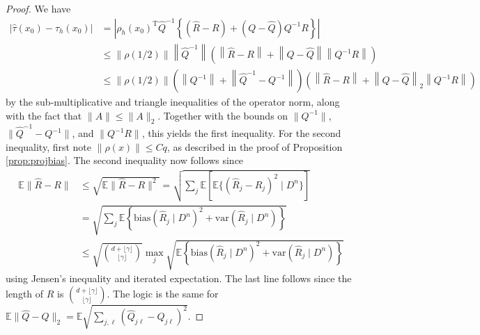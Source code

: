 \documentclass[11pt,twoside]{article}
\def\T{{ \mathrm{\scriptscriptstyle T} }}
\newcommand{\var}{\text{var}}
\newcommand{\E}{\mathbb{E}}
\newcommand{\bias}{\text{bias}}
\theoremstyle{definition}
\theoremstyle{remark}
\begin{document}
\begin{proof}
We have
\begin{align*}
| \widehat\tau(x_0) - \tau_h(x_0) | %
&= \left| \rho_h(x_0)^\T \widehat{Q}^{-1} \left\{  \left( \widehat{R} - R \right) +    \left( Q - \widehat{Q} \right) Q^{-1} R \right\} \right| \\
&\leq \|\rho(1/2) \| \left\| \widehat{Q}^{-1}  \right\| \left( \left\| \widehat{R} - R \right\|  + \left\|  Q - \widehat{Q} \right\| \left\| Q^{-1} R \right\| \right) \\
& \leq \|\rho(1/2) \| \left( \left\| Q^{-1} \right\|+ \left\| \widehat{Q}^{-1} - Q^{-1} \right\| \right) \left( \left\| \widehat{R} - R \right\|  + \left\|  Q - \widehat{Q} \right\|_2 \left\| Q^{-1} R \right\| \right)
\end{align*}
by the sub-multiplicative and triangle inequalities of the operator norm, along with the fact that $\| A \| \leq \| A \|_2$. Together with the bounds on $\|Q^{-1} \|$, $\| \widehat{Q}^{-1} - Q^{-1} \|$, and $\| Q^{-1} R \|$, this yields the first inequality. For the second inequality, first note $\| \rho(x)\| \leq Cq$, as described in the proof of Proposition \ref{prop:projbias}.  The second inequality now  follows since
\begin{align*}
\E\| \widehat{R} - R  \|  &\leq \sqrt{ \E\| \widehat{R} - R  \|^2 } %
= \sqrt{ \sum_j \E\left[ \E\Big\{ (\widehat{R}_j - R_j)^2 \mid D^n \Big\} \right] } \\
&= \sqrt{ \sum_j \E\left\{ \bias(\widehat{R}_j \mid D^n)^2 + \var(\widehat{R}_j \mid D^n) \right\} } \\
&\leq \sqrt{ {{ d + \lfloor \gamma \rfloor } \choose { \lfloor\gamma \rfloor }} } \max_j \sqrt{ \E\left\{ \bias(\widehat{R}_j \mid D^n)^2 + \var(\widehat{R}_j \mid D^n) \right\} } 
\end{align*}
using Jensen's inequality and iterated expectation. The last line follows since the length of $R$ is ${{ d + \lfloor \gamma \rfloor } \choose { \lfloor\gamma \rfloor }}$. The logic is the same for $\E\| \widehat{Q} - Q \|_2 = \E \sqrt{ \sum_{j, \ell}  (\widehat{Q}_{j\ell} - Q_{j\ell})^2}$. 
\end{proof}

\bigskip
\end{document}
